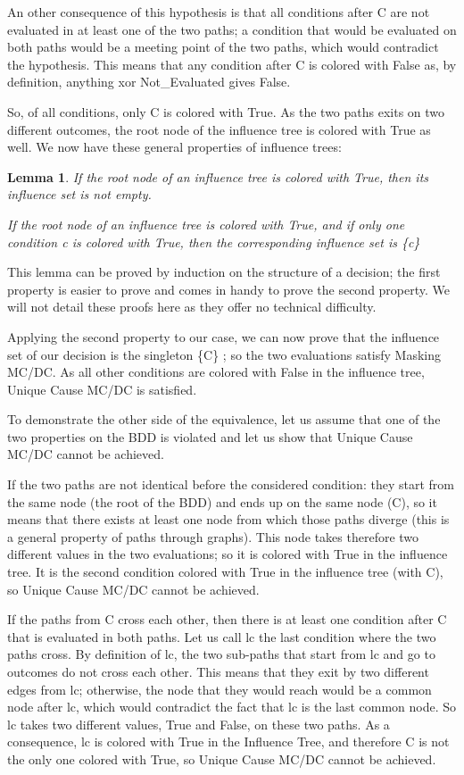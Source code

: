 \documentclass[a4paper,12pt,twoside]{article}
\newtheorem{lemma}{Lemma}[subsection]
\begin{document}
An other consequence of this hypothesis is that all conditions after C
are not evaluated in at least one of the two paths; a condition that
would be evaluated on both paths would be a meeting point of the two
paths, which would contradict the hypothesis. This means that any
condition after C is colored with False as, by definition, anything
xor Not\_Evaluated gives False.

So, of all conditions, only C is colored with True. As the two
paths exits on two different outcomes, the root node of the influence
tree is colored with True as well. We now have these general properties
of influence trees:

\begin{lemma}
  \label{lemma:influence-tree-props}
  If the root node of an influence tree is colored with True, then
  its influence set is not empty.

  If the root node of an influence tree is colored with True, and
  if only one condition c is colored with True, then the corresponding
  influence set is \{c\}
\end{lemma}

This lemma can be proved by induction on the structure of a decision;
the first property is easier to prove and comes in handy to prove the
second property. We will not detail these proofs here as they offer no
technical difficulty.

Applying the second property to our case, we can now prove that the
influence set of our decision is the singleton \{C\} ; so the two
evaluations satisfy Masking MC/DC. As all other conditions are colored
with False in the influence tree, Unique Cause MC/DC is satisfied.

To demonstrate the other side of the equivalence, let us assume that
one of the two properties on the BDD is violated and let us show that
Unique Cause MC/DC cannot be achieved.

If the two paths are not identical before the considered condition:
they start from the same node (the root of the BDD) and ends up on
the same node (C), so it means that there exists at least one node
from which those paths diverge (this is a general property of paths
through graphs). This node takes therefore two different values
in the two evaluations; so it is colored with True in the influence
tree. It is the second condition colored with True in the influence
tree (with C), so Unique Cause MC/DC cannot be achieved.

If the paths from C cross each other, then there is at least one
condition after C that is evaluated in both paths. Let us call lc the
last condition where the two paths cross. By definition of lc, the two
sub-paths that start from lc and go to outcomes do not cross each
other. This means that they exit by two different edges from lc;
otherwise, the node that they would reach would be a common node after lc,
which would contradict the fact that lc is the last common node. So
lc takes two different values, True and False, on these two paths.
As a consequence, lc is colored with True in the Influence Tree, and
therefore C is not the only one colored with True, so Unique Cause MC/DC
cannot be achieved.
\end{document}
